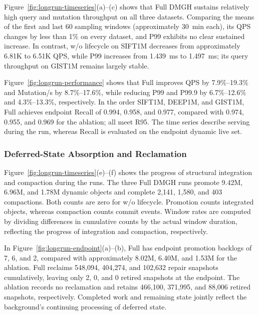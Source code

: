\documentclass[sigconf,pbalance]{acmart}
\begin{document}
Figure~\ref{fig:longrun-timeseries}(a)--(c) shows that Full DMGH sustains relatively high query and mutation throughput on all three datasets. Comparing the means of the first and last 60 sampling windows (approximately 30~min each), its QPS changes by less than 1\% on every dataset, and P99 exhibits no clear sustained increase. In contrast, w/o lifecycle on SIFT1M decreases from approximately 6.81K to 6.51K QPS, while P99 increases from 1.439~ms to 1.497~ms; its query throughput on GIST1M remains largely stable.

Figure~\ref{fig:longrun-performance} shows that Full improves QPS by 7.9\%--19.3\% and Mutation/s by 8.7\%--17.6\%, while reducing P99 and P99.9 by 6.7\%--12.6\% and 4.3\%--13.3\%, respectively. In the order SIFT1M, DEEP1M, and GIST1M, Full achieves endpoint Recall of 0.994, 0.958, and 0.977, compared with 0.974, 0.955, and 0.969 for the ablation; all meet R95. The time series describe serving during the run, whereas Recall is evaluated on the endpoint dynamic live set.
\subsubsection{Deferred-State Absorption and Reclamation}
\label{sec:longrun-lifecycle}

Figure~\ref{fig:longrun-timeseries}(e)--(f) shows the progress of structural integration and compaction during the runs. The three Full DMGH runs promote 9.42M, 6.96M, and 1.78M dynamic objects and complete 2,141, 1,580, and 403 compactions. Both counts are zero for w/o lifecycle. Promotion counts integrated objects, whereas compaction counts commit events. Window rates are computed by dividing differences in cumulative counts by the actual window duration, reflecting the progress of integration and compaction, respectively.

In Figure~\ref{fig:longrun-endpoint}(a)--(b), Full has endpoint promotion backlogs of 7, 6, and 2, compared with approximately 8.02M, 6.40M, and 1.53M for the ablation. Full reclaims 548,094, 404,274, and 102,632 repair snapshots cumulatively, leaving only 2, 0, and 0 retired snapshots at the endpoint. The ablation records no reclamation and retains 466,100, 371,995, and 88,006 retired snapshots, respectively. Completed work and remaining state jointly reflect the background's continuing processing of deferred state.
\end{document}
